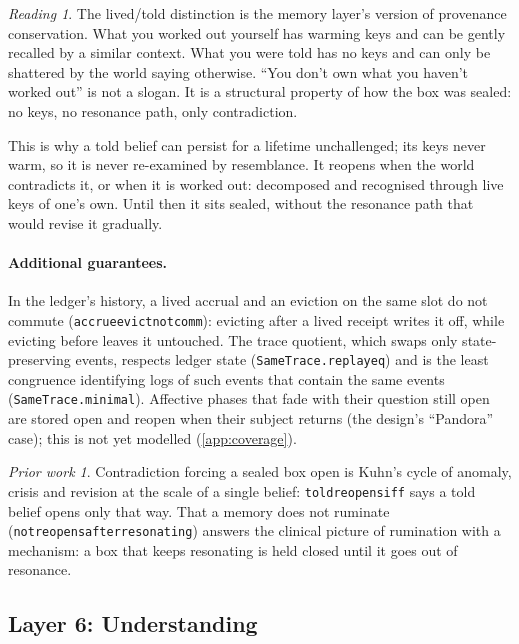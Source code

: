 \documentclass[11pt]{article}
\newcommand{\leanus}{\textunderscore\allowbreak}
\newcommand{\lean}[1]{{\let\_\leanus\texttt{#1}}}
\theoremstyle{remark}
\newtheorem*{reading}{Reading}
\newtheorem*{prior}{Prior work}
\begin{document}
\begin{reading}
The lived/told distinction is the memory layer's version of provenance conservation. What
you worked out yourself has warming keys and can be gently recalled by a similar context.
What you were told has no keys and can only be shattered by the world saying otherwise.
``You don't own what you haven't worked out'' is not a slogan. It is a structural property
of how the box was sealed: no keys, no resonance path, only contradiction.

This is why a told belief can persist for a lifetime unchallenged; its keys never warm,
so it is never re-examined by resemblance. It reopens when the world contradicts it, or
when it is worked out: decomposed and recognised through live keys of one's own. Until
then it sits sealed, without the resonance path that would revise it gradually.
\end{reading}

\paragraph{Additional guarantees.} In the ledger's history, a lived accrual and an
eviction on the same slot do not commute (\lean{accrue\_evict\_not\_comm}): evicting after
a lived receipt writes it off, while evicting before leaves it untouched. The trace
quotient, which swaps only state-preserving events, respects ledger state
(\lean{SameTrace.replay\_eq}) and is the least congruence identifying logs of such events
that contain the same events (\lean{SameTrace.minimal}). Affective phases that fade with their question still open are
stored open and reopen when their subject returns (the design's ``Pandora'' case); this is
not yet modelled (\cref{app:coverage}).

\begin{prior}
Contradiction forcing a sealed box open is Kuhn's cycle of anomaly, crisis and revision
\citep{Kuhn1962} at the scale of a single belief: \lean{told\_reopens\_iff} says a told belief
opens only that way. That a memory does not ruminate (\lean{not\_reopens\_after\_resonating})
answers the clinical picture of rumination \citep{NolenHoeksema1991} with a mechanism: a box
that keeps resonating is held closed until it goes out of resonance.
\end{prior}

\subsection{Layer 6: Understanding}
\end{document}
